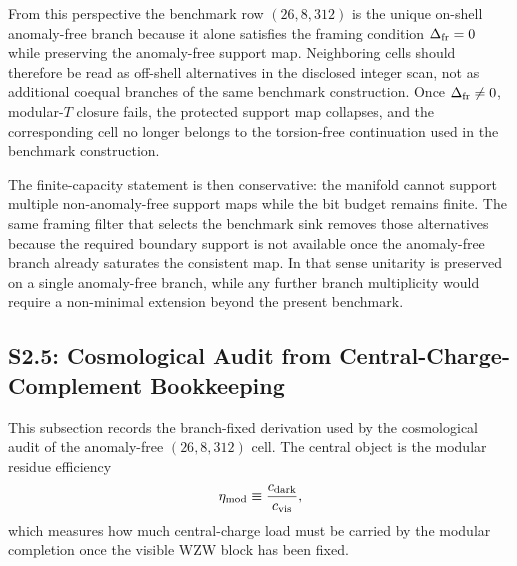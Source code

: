 \documentclass[11pt]{article}
\begin{document}
\begin{table}[t]
\caption{Finite-capacity saturation audit on the displayed fixed-parent local slice. The cosmological bit budget $N_{\rm holo}$ is external to the local $k_{\ell}$ scan and therefore essentially constant, while the visible modular gap $\Delta_{\rm mod}$ and the completion residue $c_{\rm dark}=24\,\Delta_{\rm mod}$ drift only mildly between neighboring rows. What isolates $(26,8)$ is the arithmetic closure: only there do the descendants $(I_L,I_Q)=(6,13)$ remain integer and the framing defect vanish, so the same finite register supports both the neutrino-floor scaling $m_{\nu}=\kappa_{D_5}M_PN^{-1/4}$ and the surface-tension scaling $\Lambda_{\rm holo}=3\pi/(L_P^2N)$.}
\label{tab:s8-bit-budget-saturation}
\end{table}

From this perspective the benchmark row $(26,8,312)$ is the unique on-shell
anomaly-free branch because it alone satisfies the framing condition
$\Delta_{\rm fr}=0$ while preserving the anomaly-free support map. Neighboring
cells should therefore be read as off-shell alternatives in the disclosed
integer scan, not as additional coequal branches of the same benchmark
construction. Once $\Delta_{\rm fr}\neq0$, modular-$T$ closure fails, the
protected support map collapses, and the corresponding cell no longer belongs
to the torsion-free continuation used in the benchmark construction.

The finite-capacity statement is then conservative: the manifold cannot support
multiple non-anomaly-free support maps while the bit budget remains finite.
The same framing filter that selects the benchmark sink removes those
alternatives because the required boundary support is not available once the
anomaly-free branch already saturates the consistent map. In that sense
unitarity is preserved on a single anomaly-free branch, while any further
branch multiplicity would require a non-minimal extension beyond the present
benchmark.

\subsection*{S2.5: Cosmological Audit from Central-Charge-Complement Bookkeeping}

This subsection records the branch-fixed derivation used by the cosmological
audit of the anomaly-free $(26,8,312)$ cell. The central object is the
modular residue efficiency
\begin{equation}
 \eta_{\rm mod}\equiv \frac{c_{\rm dark}}{c_{\rm vis}},
\end{equation}
which measures how much central-charge load must be carried by the modular
completion once the visible WZW block has been fixed.
\end{document}
